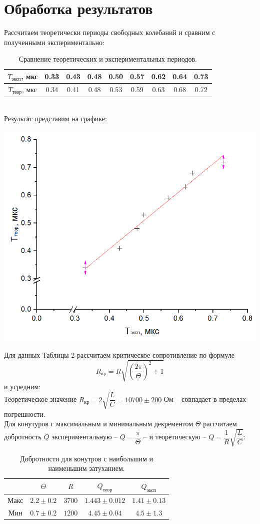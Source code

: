 \documentclass[a4paper,12pt]{article}
\begin{document}
\section*{Обработка результатов}
Рассчитаем теоретически периоды свободных колебаний и сравним с полученными экспериментально:
\begin{table}[h]
\centering
\begin{tabular}{|c|c|c|c|c|c|c|c|c|}
\hline
$T_{\text{эксп}}$, мкс & 0.33 & 0.43 & 0.48 & 0.50 & 0.57 & 0.62 & 0.64 & 0.73 \\ \hline
$T_{\text{теор}}$, мкс & 0.34 & 0.41 & 0.48 & 0.53 & 0.59 & 0.63 & 0.68 & 0.72 \\ \hline
\end{tabular}
\caption{Сравнение теоретических и экспериментальных периодов.}
\end{table}\\
Результат представим на графике:
\begin{center}
\includegraphics[scale=0.6]{5.png}
\end{center}
Для данных Таблицы 2 рассчитаем критическое сопротивление по формуле 
$$
R_{\text{кр}}=R\sqrt{\left( \dfrac{2\pi}{\Theta}\right)^2 + 1}
$$ 
и усредним:
\\
Теоретическое значение $R_{\text{кр}}=2\sqrt{\dfrac{L}{C}} = 10700 \pm 200$ Ом -- совпадает в пределах погрешности.\\
Для конутуров с максимальным и минимальным декрементом $\Theta$ рассчитаем добротность $Q$ экспериментальную -- $Q = \dfrac{\pi}{\Theta}$ -- и теоретическую -- $Q=\dfrac{1}{R}\sqrt{\dfrac{L}{C}}$:
\begin{table}[h]
\centering
\begin{tabular}{|c|c|c|c|c|}
\hline
     & $\Theta$      & $R$    & $Q_{\text{теор}}$         & $Q_{\text{эксп}}$  \\ \hline
Макс & $2.2 \pm 0.2$ & $3700$ & $1.443 \pm 0.012$ & $1.41 \pm 0.13$ \\ \hline
Мин  & $0.7 \pm 0.2$ & $1200$ & $4.45 \pm 0.04$   & $4.5 \pm 1.3  $ \\ \hline
\end{tabular}
\caption{Добротности для конутров с наибольшим и наименьшим затуханием.}
\end{table}
\end{document}
